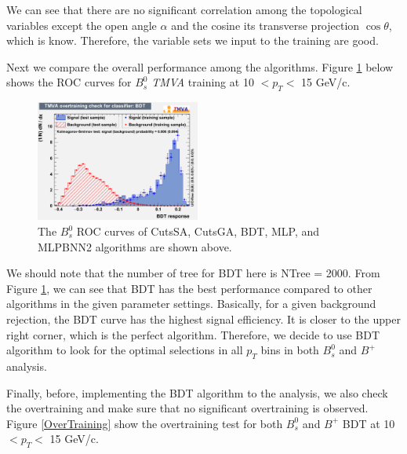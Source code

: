 We can see that there are no significant correlation among the topological variables except the open angle $\alpha$ and the cosine its transverse projection $ \cos\theta$, which is know. Therefore, the variable sets we input to the  training are good.  

Next we compare the overall performance among the algorithms. Figure \ref{ROCAll} below shows the ROC curves for $B^0_s$ \textit{TMVA} training at 10 $< p_T < $ 15 GeV/c.

\begin{figure}[h]
\begin{center}
\includegraphics[width= 0.48\textwidth]{Figures/Chapter4/BPOT.pdf}
\caption{The $B^0_s$ ROC curves of CutsSA, CutsGA, BDT, MLP, and MLPBNN2 algorithms are shown above.}
\label{ROCAll}
\end{center}
\end{figure}

We should note that the number of tree for BDT here is NTree = 2000. From Figure \ref{ROCAll}, we can see that BDT has the best performance compared to other algorithms in the given parameter settings. Basically, for a given background rejection, the BDT curve has the highest signal efficiency. It is closer to the upper right corner, which is the perfect algorithm. Therefore, we decide to use BDT algorithm to look for the optimal selections in all $p_T$ bins in both $B^0_s$ and $B^+$ analysis.


Finally, before, implementing the BDT algorithm to the analysis, we also check the overtraining and make sure that no significant overtraining is observed. Figure \ref{OverTraining} show the overtraining test for both $B^0_s$ and $B^+$ BDT at 10 $< p_T < $ 15 GeV/c. 


